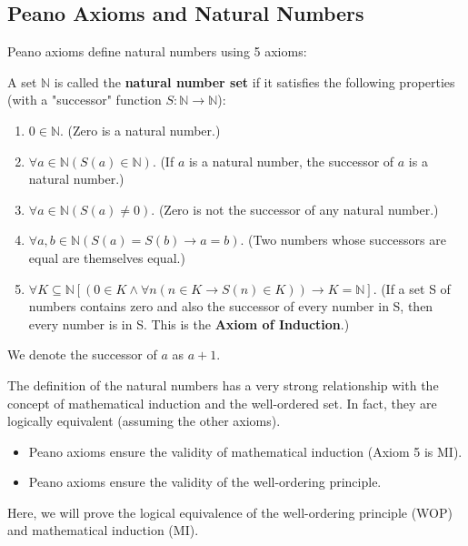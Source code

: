 \subsection{Peano Axioms and Natural Numbers}
Peano axioms define natural numbers using 5 axioms:
\begin{definition}
A set $\mathbb{N}$ is called the \textbf{natural number set} if it satisfies the following properties (with a "successor" function $S: \mathbb{N} \to \mathbb{N}$):
\begin{enumerate}
    \item $0 \in \mathbb{N}$. (Zero is a natural number.)
    \item $\forall a \in \mathbb{N} (S(a) \in \mathbb{N})$. (If $a$ is a natural number, the successor of $a$ is a natural number.)
    \item $\forall a \in \mathbb{N} (S(a) \ne 0)$. (Zero is not the successor of any natural number.)
    \item $\forall a, b \in \mathbb{N} (S(a) = S(b) \to a = b)$. (Two numbers whose successors are equal are themselves equal.)
    \item $\forall K \subseteq \mathbb{N} [(0 \in K \wedge \forall n (n \in K \to S(n) \in K)) \to K = \mathbb{N}]$. (If a set S of numbers contains zero and also the successor of every number in S, then every number is in S. This is the \textbf{Axiom of Induction}.)
\end{enumerate}
We denote the successor of $a$ as $a+1$.
\end{definition}

The definition of the natural numbers has a very strong relationship with the concept of mathematical induction and the well-ordered set. In fact, they are logically equivalent (assuming the other axioms).
\begin{itemize}
    \item Peano axioms ensure the validity of mathematical induction (Axiom 5 is MI).
    \item Peano axioms ensure the validity of the well-ordering principle.
\end{itemize}

Here, we will prove the logical equivalence of the well-ordering principle (WOP) and mathematical induction (MI).

